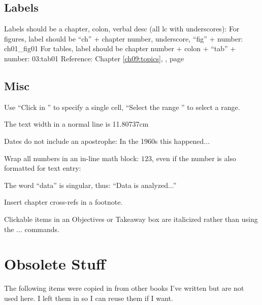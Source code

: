 \begin{enumerate}[resume]
\subsection{Labels}
Labels should be a chapter, colon, verbal desc (all lc with underscores): \label{03:title}
For figures, label should be ``ch'' + chapter number, underscore, ``fig'' + number: ch01_fig01
For tables, label should be chapter number + colon + ``tab'' + number: 03:tab01
Reference: Chapter \ref{ch09:topics}, , page \pageref{ch09:topics}

\subsection{Misc}
Use ``Click in '' to specify a single cell, ``Select the range '' to select a range.

The text width in a normal line is 11.80737cm

Dates do not include an apostrophe: In the 1960s this happened...

Wrap all numbers in an in-line math block: $ 123 $, even if the number is also formatted for text entry: 

The word ``data'' is singular, thus: ``Data is analyzed...''

Insert chapter cross-refs in a footnote.

Clickable items in an Objectives or Takeaway box are italicized rather than using the \fmt... commands.


\section{Obsolete Stuff}
The following items were copied in from other books I've written but are not used here. I left them in so I can reuse them if I want.




\end{enumerate}
